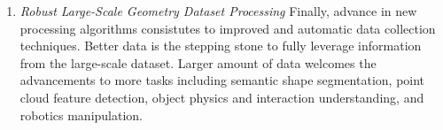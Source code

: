 \begin{enumerate}
\item \emph{Robust Large-Scale Geometry Dataset Processing}
Finally, advance in new processing algorithms consistutes to improved and automatic data collection techniques. Better data is the stepping stone to fully leverage information from the large-scale dataset\cite{Koch_2019_CVPR,zhou2016thingi10k}. 
Larger amount of data welcomes the advancements to more tasks including semantic shape segmentation, point cloud feature detection, object physics and interaction understanding, and robotics manipulation.

\end{enumerate}

